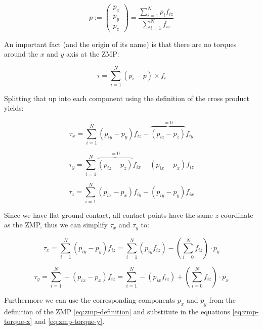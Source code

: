 \documentclass[english,ngerman]{KITreprt}
\begin{document}
\begin{equation} \label{eq:zmp-definition}
p := \left(\begin{array}{c}
p_x \\ p_y \\ p_z
\end{array}\right)
   = \frac{\sum^N_{i=1}p_i f_{iz}}{\sum^N_{i=1} f_{iz}}
\end{equation}

An important fact (and the origin of its name) is that there are no
torques around the $x$ and $y$ axis at the ZMP:

\begin{equation}
\tau = \sum^N_{i=1} (p_i - p) \times f_i
\end{equation}

Splitting that up into each component using the definition of the cross
product yields:

\begin{equation}
\tau_x = \sum^N_{i=1} (p_{iy} - p_y) f_{iz} - \overbrace{(p_{iz} - p_z)}^{=0} f_{iy}
\end{equation}

\begin{equation}
\tau_y = \sum^N_{i=1} \overbrace{(p_{iz} - p_z)}^{=0} f_{ix} - (p_{ix} - p_x) f_{iz}
\end{equation}

\begin{equation}
\tau_z = \sum^N_{i=1} (p_{ix} - p_x) f_{iy} - (p_{iy} - p_y) f_{ix}
\end{equation}

Since we have flat ground contact, all contact points have the same
$z$-coordinate as the ZMP, thus we can simplify $\tau_x$ and $\tau_y$
to:

\begin{equation} \label{eq:zmp-torque-x}
\tau_x = \sum^N_{i=1} (p_{iy} - p_y) f_{iz} = \sum^N_{i=1} (p_{iy} f_{iz}) - (\sum^N_{i=0} f_{iz}) \cdot p_y
\end{equation}

\begin{equation}\label{eq:zmp-torque-y}
\tau_y = \sum^N_{i=1} - (p_{ix} - p_x) f_{iz} = \sum^N_{i=1} - (p_{ix} f_{iz}) + (\sum^N_{i=0} f_{iz}) \cdot p_x
\end{equation}

Furthermore we can use the corresponding components $p_x$ and $p_y$ from
the definition of the ZMP \ref{eq:zmp-definition} and substitute in the
equations \ref{eq:zmp-torque-x} and \ref{eq:zmp-torque-y}.
\end{document}
